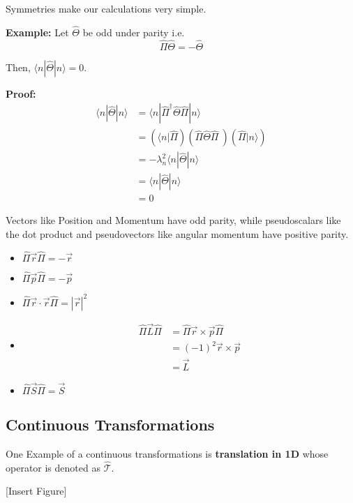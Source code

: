 \documentclass{article}
\newcommand*{\T}{\mathcal T}
\newcommand{\ket}[1]{|#1 \rangle}
\newcommand{\bra}[1]{\langle #1|}
\newcommand{\inner}[2]{\langle #1 | #2 \rangle}
\begin{document}
\vskip 1cm
Symmetries make our calculations very simple.
\begin{dottedbox}

\textbf{Example:} Let $\hat{\Theta}$ be odd under parity i.e.
\[ \hat{\Pi} \hat{\Theta} = - \hat{\Theta} \]

Then, $\inner{n}{\hat{\Theta}|n} = 0$.

\vskip 0.5cm
\textbf{Proof:}
\begin{align*}
  \inner{n|\hat{\Theta}}{n} &= \inner{n|\hat{\Pi}^{\dagger}\hat{\Theta} \hat{\Pi} }{n} \\
  &=  \left( \bra{n} \hat{\Pi} \right)\left( \hat{\Pi} \hat{\Theta} \hat{\Pi}\ \right) \left( \hat{\Pi}\ket{n} \right)\\
  &= -\lambda_n^2 \inner{n}{\hat{\Theta}|n} \\
  &= \inner{n}{\hat{\Theta}|n} \\
  &= 0
\end{align*}
\end{dottedbox}

\vskip 1cm
Vectors like Position and Momentum have odd parity, while pseudoscalars like the dot product and pseudovectors like angular momentum have positive parity.

\begin{itemize}
  \item $\hat{\Pi} \vec{r} \hat{\Pi} = -\vec{r}$
  \item $\hat{\Pi} \vec{p} \hat{\Pi} = -\vec{p}$
  \item $\hat{\Pi} \vec{r} \cdot \vec{r} \hat{\Pi} = |\vec{r}|^2$
  \item \begin{align*}
    \hat{\Pi} \vec{L} \hat{\Pi} &= \hat{\Pi} \vec{r} \times \vec{p} \hat{\Pi} \\
    &= (-1)^2 \vec{r} \times \vec{p} \\
    &=\vec{L}
  \end{align*}
  \item $\hat{\Pi} \vec{S} \hat{\Pi} = \vec{S}$
\end{itemize}

\vskip 1cm
\subsection{Continuous Transformations}
One Example of a continuous transformations is \textbf{translation in 1D} whose operator is denoted as $\hat{\T}$.

\vskip 0.5cm
[Insert Figure]
\end{document}
